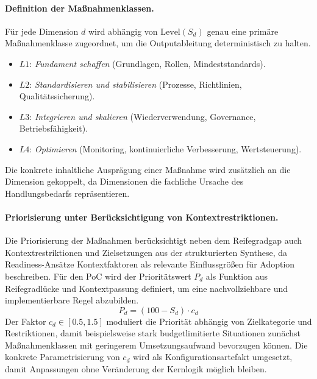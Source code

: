 \paragraph{Definition der Maßnahmenklassen.}
Für jede Dimension $d$ wird abhängig von $\text{Level}(S_d)$ genau eine primäre Maßnahmenklasse zugeordnet, um die Outputableitung deterministisch zu halten.\cite{BeckerKnackstedtPoeppelbuss2009ProcedureModel,Hevner2004DesignScience}
\begin{itemize}
\item $L1$: \emph{Fundament schaffen} (Grundlagen, Rollen, Mindeststandards).\cite{RoeglingerPoeppelbuss2011BPMMaturityModels}
\item $L2$: \emph{Standardisieren und stabilisieren} (Prozesse, Richtlinien, Qualitätssicherung).\cite{RoeglingerPoeppelbuss2011BPMMaturityModels}
\item $L3$: \emph{Integrieren und skalieren} (Wiederverwendung, Governance, Betriebsfähigkeit).\cite{RoeglingerPoeppelbuss2011BPMMaturityModels}
\item $L4$: \emph{Optimieren} (Monitoring, kontinuierliche Verbesserung, Wertsteuerung).\cite{RoeglingerPoeppelbuss2011BPMMaturityModels}
\end{itemize}
Die konkrete inhaltliche Ausprägung einer Maßnahme wird zusätzlich an die Dimension gekoppelt, da Dimensionen die fachliche Ursache des Handlungsbedarfs repräsentieren.\cite{deBruin2005MainPhases,PoeppeelbussRoeglinger2011DesignPrinciples}

\paragraph{Priorisierung unter Berücksichtigung von Kontextrestriktionen.}
Die Priorisierung der Maßnahmen berücksichtigt neben dem Reifegradgap auch Kontextrestriktionen und Zielsetzungen aus der strukturierten Synthese, da Readiness-Ansätze Kontextfaktoren als relevante Einflussgrößen für Adoption beschreiben.\cite{TornatzkyFleischer1990TOE,OliveiraMartins2011ITAdoptionReview}
Für den PoC wird der Prioritätswert $P_d$ als Funktion aus Reifegradlücke und Kontextpassung definiert, um eine nachvollziehbare und implementierbare Regel abzubilden.\cite{BeckerKnackstedtPoeppelbuss2009ProcedureModel,Hevner2004DesignScience}
\begin{equation}
P_d = (100 - S_d)\cdot c_d
\end{equation}
Der Faktor $c_d \in [0.5,1.5]$ moduliert die Priorität abhängig von Zielkategorie und Restriktionen, damit beispielsweise stark budgetlimitierte Situationen zunächst Maßnahmenklassen mit geringerem Umsetzungsaufwand bevorzugen können.\cite{TornatzkyFleischer1990TOE,OliveiraMartins2011ITAdoptionReview}
Die konkrete Parametrisierung von $c_d$ wird als Konfigurationsartefakt umgesetzt, damit Anpassungen ohne Veränderung der Kernlogik möglich bleiben.\cite{MarchSmith1995DesignNaturalScience,Hevner2004DesignScience}

